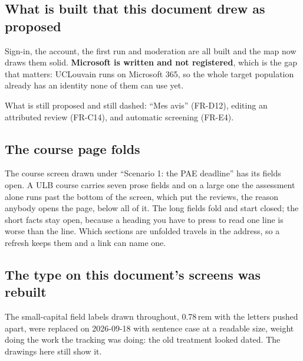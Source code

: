 \documentclass[11pt,a4paper]{article}
\begin{document}
\subsection{What is built that this document drew as proposed}

Sign-in, the account, the first run and moderation are all built and the map
now draws them solid. \textbf{Microsoft is written and not registered}, which
is the gap that matters: UCLouvain runs on Microsoft 365, so the whole target
population already has an identity none of them can use yet.

What is still proposed and still dashed: ``Mes avis'' (FR-D12), editing an
attributed review (FR-C14), and automatic screening (FR-E4).

\subsection{The course page folds}

The course screen drawn under ``Scenario 1: the PAE deadline'' has its
fields open.
A ULB course carries seven prose fields and on a large one the assessment alone
runs past the bottom of the screen, which put the reviews, the reason anybody
opens the page, below all of it. The long fields fold and start closed; the
short facts stay open, because a heading you have to press to read one line is
worse than the line. Which sections are unfolded travels in the address, so a
refresh keeps them and a link can name one.

\subsection{The type on this document's screens was rebuilt}

The small-capital field labels drawn throughout, 0.78\,rem with the letters
pushed apart, were replaced on 2026-09-18 with sentence case at a readable
size, weight doing the work the tracking was doing: the old treatment looked
dated. The drawings here still show it.
\end{document}

